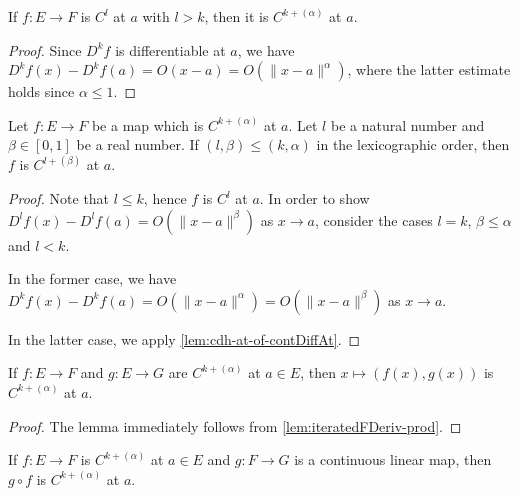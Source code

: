 \begin{lemma}%
  \label{lem:cdh-at-of-contDiffAt}
  \leanok%
  If \(f\colon E\to F\) is \(C^{l}\) at \(a\) with \(l > k\),
  then it is \(C^{k+(\alpha)}\) at \(a\).
\end{lemma}
\begin{proof}
  \leanok%
  Since \(D^{k}f\) is differentiable at \(a\), we have \(D^{k}f(x)-D^{k}f(a)=O(x - a)=O(\|x - a\|^{\alpha})\),
  where the latter estimate holds since \(\alpha \le 1\).
\end{proof}

\begin{lemma}%
  \label{lem:cdh-at-mono}
  \leanok%
  Let \(f\colon E\to F\) be a map which is \(C^{k+(\alpha)}\) at \(a\).
  Let \(l\) be a natural number and \(\beta \in [0, 1]\) be a real number.
  If \((l, \beta) \le (k, \alpha)\) in the lexicographic order,
  then \(f\) is \(C^{l+(\beta)}\) at \(a\).
\end{lemma}

\begin{proof}
  \leanok%
  Note that \(l\le k\), hence \(f\) is \(C^{l}\) at \(a\).
  In order to show \(D^{l}f(x) - D^{l}f(a) = O(\|x - a\|^{\beta})\) as \(x\to a\),
  consider the cases \(l = k\), \(\beta \le \alpha\) and \(l < k\).

  In the former case, we have \(D^{k}f(x) - D^{k}f(a) = O\left(\|x - a\|^{\alpha}\right)=O\left(\|x - a\|^{\beta}\right)\) as \(x\to a\).

  In the latter case, we apply \autoref{lem:cdh-at-of-contDiffAt}.
\end{proof}

\begin{lemma}%
  \label{lem:cdh-at-prodMk}
  If \(f \colon E \to F\) and \(g \colon E \to G\) are \(C^{k+(\alpha)}\) at \(a \in E\),
  then \(x \mapsto (f(x), g(x))\) is \(C^{k+(\alpha)}\) at \(a\).
\end{lemma}
\begin{proof}
  The lemma immediately follows from \autoref{lem:iteratedFDeriv-prod}.
\end{proof}

\begin{lemma}%
  \label{lem:cdh-at-clm-comp}
  If \(f \colon E \to F\) is \(C^{k+(\alpha)}\) at \(a \in E\)
  and \(g \colon F \to G\) is a continuous linear map,
  then \(g \circ f\) is \(C^{k+(\alpha)}\) at \(a\).
\end{lemma}

